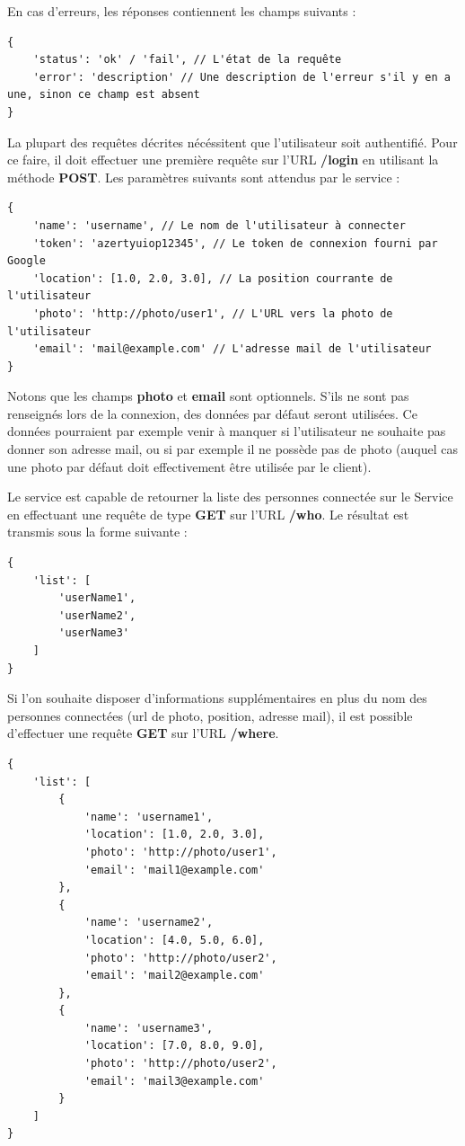 En cas d'erreurs, les réponses contiennent les champs suivants :
\lstset{language=Javascript}
\begin{lstlisting}[caption=Corps général de la réponse serveur]
{
    'status': 'ok' / 'fail', // L'état de la requête
    'error': 'description' // Une description de l'erreur s'il y en a une, sinon ce champ est absent
}
\end{lstlisting}

La plupart des requêtes décrites nécéssitent que l'utilisateur soit authentifié. Pour ce faire, il doit effectuer une première requête sur l'URL \textbf{/login} en utilisant la méthode \textbf{POST}. Les paramètres suivants sont attendus par le service :
\lstset{language=Javascript}
\begin{lstlisting}[caption=Corps de la requête POST /login, label=postlogin]
{
    'name': 'username', // Le nom de l'utilisateur à connecter
    'token': 'azertyuiop12345', // Le token de connexion fourni par Google
    'location': [1.0, 2.0, 3.0], // La position courrante de l'utilisateur
    'photo': 'http://photo/user1', // L'URL vers la photo de l'utilisateur
    'email': 'mail@example.com' // L'adresse mail de l'utilisateur
}
\end{lstlisting}

Notons que les champs \textbf{photo} et \textbf{email} sont optionnels. S'ils ne sont pas renseignés lors de la connexion, des données par défaut seront utilisées. Ce données pourraient par exemple venir à manquer si l'utilisateur ne souhaite pas donner son adresse mail, ou si par exemple il ne possède pas de photo (auquel cas une photo par défaut doit effectivement être utilisée par le client).

Le service est capable de retourner la liste des personnes connectée sur le Service en effectuant une requête de type \textbf{GET} sur l'URL \textbf{/who}. Le résultat est transmis sous la forme suivante :
\lstset{language=Javascript}
\begin{lstlisting}[caption=Corps de la réponse GET /who]
{
    'list': [
        'userName1',
        'userName2',
        'userName3'
    ]
}
\end{lstlisting}

Si l'on souhaite disposer d'informations supplémentaires en plus du nom des personnes connectées (url de photo, position, adresse mail), il est possible d'effectuer une requête \textbf{GET} sur l'URL \textbf{/where}.
\lstset{language=Javascript}
\begin{lstlisting}[caption=Corps de la réponse GET /where]
{
    'list': [
        {
            'name': 'username1',
            'location': [1.0, 2.0, 3.0],
            'photo': 'http://photo/user1',
            'email': 'mail1@example.com'
        },
        {
            'name': 'username2',
            'location': [4.0, 5.0, 6.0],
            'photo': 'http://photo/user2',
            'email': 'mail2@example.com'
        },
        {
            'name': 'username3',
            'location': [7.0, 8.0, 9.0],
            'photo': 'http://photo/user2',
            'email': 'mail3@example.com'
        }
    ]
}
\end{lstlisting}

